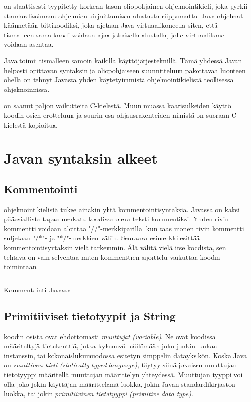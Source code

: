 \documentclass{tufte-book}
\newcommand{\eng}[1]{\textit{(#1)}}
\newcommand{\new}[1]{\textit{\gls{#1}}}
\newcommand{\neweng}[2]{\new{#1} \eng{#2}}
\newcommand{\code}[3]{
\begin{listing}
    \inputminted{java}{OhjelmointiopasEsimerkit/src/#1/#2.java}
    \caption{#3}
    \label{Java-#1-#2}
\end{listing}
}
\begin{document}
 on staattisesti tyypitetty korkean tason oliopohjainen ohjelmointikieli, joka
pyrkii standardisoimaan ohjelmien kirjoittamisen alustasta riippumatta. Java-ohjelmat käännetään
bittikoodiksi, joka ajetaan Java-virtuaalikoneella siten, että tismalleen sama koodi voidaan ajaa
jokaisella alustalla, jolle virtuaalikone voidaan asentaa.

 Java toimii tismalleen samoin kaikilla käyttöjärjestelmillä. Tämä
yhdessä Javan helposti opittavan syntaksin ja oliopohjaiseen suunnitteluun pakottavan luonteen
ohella on tehnyt Javasta yhden käytetyimmistä ohjelmointikielistä teollisessa ohjelmoinnissa.

 on saanut paljon vaikutteita C-kielestä. Muun muassa kaarisulkeiden
käyttö koodin osien erotteluun ja suurin osa ohjausrakenteiden nimistä on suoraan C-kielestä
kopioitua.


\section{Javan syntaksin alkeet}
\label{syntaksin alkeista}

\subsection{Kommentointi}
\label{kommentointi}

 ohjelmointikielistä tukee ainakin yhtä kommentointisyntaksia. Javassa on
kaksi pääasiallista tapaa merkata koodissa oleva teksti kommentiksi. Yhden rivin kommentti voidaan
aloittaa "//"-merkkiparilla, kun taas monen rivin kommentti suljetaan "/*"- ja "*/"-merkkien
väliin. Seuraava esimerkki esittää kommentointisyntaksin vielä tarkemmin. Älä välitä vielä itse
koodista, sen tehtävä on vain selventää miten kommenttien sijoittelu vaikuttaa koodin toimintaan.

\code{week2}{CommentingExample}{Kommentointi Javassa}

\subsection{Primitiiviset tietotyypit ja String}
\label{tietotyypit}

 koodin osista ovat ehdottomasti \textit{\gls{muuttuja}t}
\eng{variable}. Ne ovat koodissa määriteltyjä tietokenttiä, jotka kykenevät säilömään joko jonkin
luokan instanssin, tai kokonaislukumuodossa esitetyn simppelin datayksikön. Koska Java on 
\neweng{staattinen kieli}{statically typed language}, täytyy siinä jokaisen muuttujan tietotyyppi
määritellä muuttujan määrittelyn yhteydessä. Muuttujan tyyppi voi olla joko jokin käyttäjän
määrittelemä luokka, jokin Javan standardikirjaston luokka, tai jokin \neweng{primitiivinen
tietotyyppi}{primitive data type}.
\end{document}
